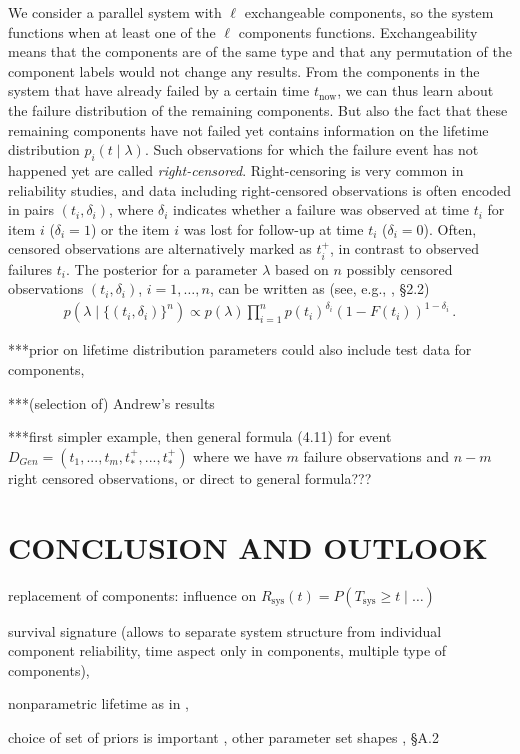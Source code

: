 \documentclass[12pt,a4paper,twocolumn,fleqn]{narms}
\begin{document}
We consider a parallel system with $\ell$ exchangeable components,
so the system functions when at least one of the $\ell$ components functions.
Exchangeability means that the components are of the same type
and that any permutation of the component labels would not change any results.
From the components in the system that have already failed by a certain time $t_\text{now}$,
we can thus learn about the failure distribution of the remaining components.
But also the fact that these remaining components have not failed yet
contains information on the lifetime distribution $p_i(t\mid \lambda)$.
Such observations for which the failure event has not happened yet are called \emph{right-censored}.
Right-censoring is very common in reliability studies,
and data including right-censored observations is often encoded
in pairs $(t_i, \delta_i)$, where $\delta_i$ indicates whether
a failure was observed at time $t_i$ for item $i$ ($\delta_i = 1$)
or the item $i$ was lost for follow-up at time $t_i$ ($\delta_i = 0$).
Often, censored observations are alternatively marked as $t_i^+$, in contrast to observed failures $t_i$.
The posterior for a parameter $\lambda$ based on $n$ possibly censored observations
$(t_i, \delta_i)$, $i=1,\ldots,n$,
can be written as (see, e.g., , \S 2.2)
\begin{align}
p(\lambda \mid \{(t_i, \delta_i)\}^n) \propto p(\lambda) \prod_{i=1}^n p(t_i)^{\delta_i} (1-F(t_i))^{1-\delta_i}\,.
\end{align}


***prior on lifetime distribution parameters could also include test data for components,

***(selection of) Andrew's results

***first simpler example, then general formula (4.11) for
event $D_{Gen}=(t_1,...,t_m,t_*^+,...,t_*^+)$ where we have $m$ failure observations and $n-m$ right censored observations,
or direct to general formula???



\section{CONCLUSION AND OUTLOOK}

replacement of components: influence on $R_\text{sys}(t) = P(T_\text{sys} \geq t \mid \ldots)$ 

survival signature \cite{2012:survsign} (allows to separate system structure from individual component reliability,
time aspect only in components, multiple type of components),

nonparametric lifetime as in ,

choice of set of priors is important \cite{1991:pericchi},
other parameter set shapes \cite{Walter2011a}, \cite{diss} \S A.2




\end{document}
